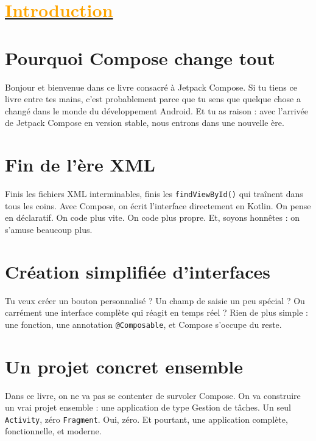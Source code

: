 \section{\hyperref[sec:summary]{\textcolor{orange}{Introduction}}}\label{sec:intro}
\noindent
\noindent
\begin{minipage}[t]{0.48\textwidth}
\section*{Pourquoi Compose change tout}

Bonjour et bienvenue dans ce livre consacré à Jetpack Compose.  
Si tu tiens ce livre entre tes mains, c’est probablement parce que tu sens que quelque chose a changé dans le monde du développement Android.  
Et tu as raison : avec l’arrivée de Jetpack Compose en version stable, nous entrons dans une nouvelle ère.  

\vspace{2em} %

\section*{Fin de l’ère XML}

Finis les fichiers XML interminables, finis les \texttt{findViewById()} qui traînent dans tous les coins.  
Avec Compose, on écrit l’interface directement en Kotlin.  
On pense en déclaratif.  
On code plus vite.  
On code plus propre.  
Et, soyons honnêtes : on s’amuse beaucoup plus.  
\end{minipage}
\hfill
\begin{minipage}[t]{0.48\textwidth}
\section*{Création simplifiée d’interfaces}

Tu veux créer un bouton personnalisé ?  
Un champ de saisie un peu spécial ?  
Ou carrément une interface complète qui réagit en temps réel ?  
Rien de plus simple : une fonction, une annotation \texttt{@Composable}, et Compose s’occupe du reste.  

\vspace{2em} %

\section*{Un projet concret ensemble}

Dans ce livre, on ne va pas se contenter de survoler Compose.  
On va construire un vrai projet ensemble : une application de type Gestion de tâches.  
Un seul \texttt{Activity}, zéro \texttt{Fragment}. Oui, zéro.  
Et pourtant, une application complète, fonctionnelle, et moderne.  
\end{minipage}

